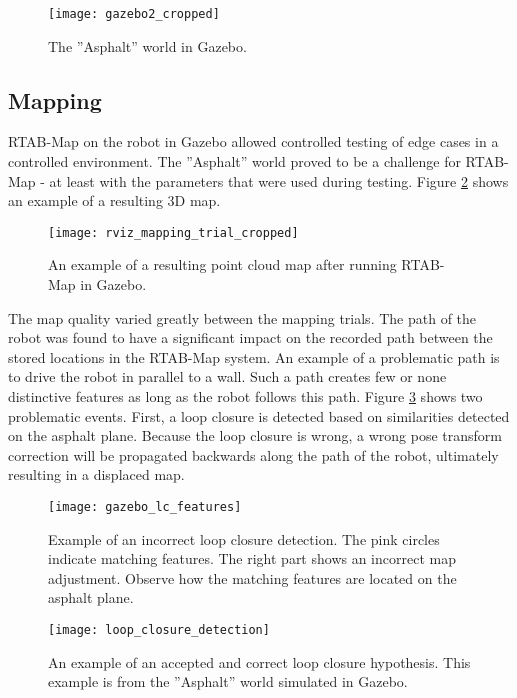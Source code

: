 \begin{figure}[h]
	\centering
	\texttt{[image: gazebo2\_cropped]}
	\caption{The ''Asphalt'' world in Gazebo. }
	\label{fig:gazebo2_cropped}
\end{figure}

\subsection{Mapping}

\ac{RTAB-Map} on the robot in Gazebo allowed controlled testing of edge cases in a controlled environment. The ''Asphalt'' world proved to be a challenge for \ac{RTAB-Map} - at least with the parameters that were used during testing. Figure \ref{fig:rviz_mapping_trial} shows an example of a resulting 3D map. 

\begin{figure}[h]
	\centering
	\texttt{[image: rviz\_mapping\_trial\_cropped]}
	\caption{An example of a resulting point cloud map after running \ac{RTAB-Map} in Gazebo. }
	\label{fig:rviz_mapping_trial}
\end{figure}

The map quality varied greatly between the mapping trials. The path of the robot was found to have a significant impact on the recorded path between the stored locations in the \ac{RTAB-Map} system. An example of a problematic path is to drive the robot in parallel to a wall. Such a path creates few or none distinctive features as long as the robot follows this path. Figure \ref{fig:gazebo_lc_features} shows two problematic events. First, a loop closure is detected based on similarities detected on the asphalt plane. Because the loop closure is wrong, a wrong pose transform correction will be propagated backwards along the path of the robot, ultimately resulting in a displaced map.

\begin{figure}[h]
	\centering
	\texttt{[image: gazebo\_lc\_features]}
	\caption{Example of an incorrect loop closure detection. The pink circles indicate matching features. The right part shows an incorrect map adjustment. Observe how the matching features are located on the asphalt plane.}
	\label{fig:gazebo_lc_features}
\end{figure}

\begin{figure}[h]
	\centering
	\texttt{[image: loop\_closure\_detection]}
	\caption{An example of an accepted and correct loop closure hypothesis. This example is from the ''Asphalt'' world simulated in Gazebo.}
	\label{fig:loop_closure_detection}
\end{figure}

